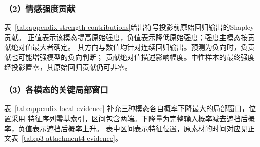 \subsubsection*{（2）情感强度贡献}
表~\ref{tab:appendix-strength-contributions}给出符号投影前原始回归输出的Shapley贡献。
正值表示该模态提高原始强度，负值表示降低原始强度；强度主模态按贡献绝对值最大者确定。
其方向与数值均针对连续回归输出。预测为负向时，负贡献也可能增强模型的负向判断；
贡献绝对值描述影响幅度。中性样本的最终强度经投影置零，其原始回归贡献仍可非零。


\subsubsection*{（3）各模态的关键局部窗口}
表~\ref{tab:appendix-local-evidence} 补充三种模态各自概率下降最大的局部窗口，位置采用
特征序列零基索引，区间包含两端。下降量为完整输入概率减去遮挡后概率，负值表示遮挡后概率上升。
表中区间表示特征位置，原素材的时间对应见正文表~\ref{tab:p3-attachment4-evidence}。
\begingroup
\renewcommand{\arraystretch}{1.25}
